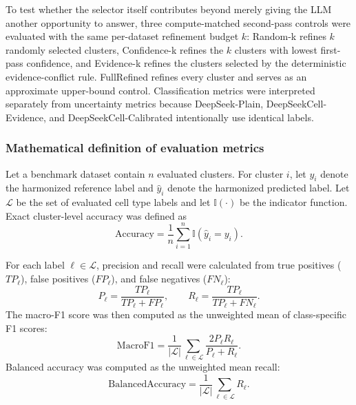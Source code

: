 \documentclass[referee,lineno,pdflatex]{sn-jnl}
\begin{document}
To test whether the selector itself contributes beyond merely giving the LLM another opportunity to answer, three compute-matched second-pass controls were evaluated with the same per-dataset refinement budget $k$: Random-k refines $k$ randomly selected clusters, Confidence-k refines the $k$ clusters with lowest first-pass confidence, and Evidence-k refines the clusters selected by the deterministic evidence-conflict rule. FullRefined refines every cluster and serves as an approximate upper-bound control. Classification metrics were interpreted separately from uncertainty metrics because DeepSeek-Plain, DeepSeekCell-Evidence, and DeepSeekCell-Calibrated intentionally use identical labels.

\subsubsection{Mathematical definition of evaluation metrics}

Let a benchmark dataset contain $n$ evaluated clusters. For cluster $i$, let $y_i$ denote the harmonized reference label and $\hat{y}_i$ denote the harmonized predicted label. Let $\mathcal{L}$ be the set of evaluated cell type labels and let $\mathbb{I}(\cdot)$ be the indicator function. Exact cluster-level accuracy was defined as
\begin{equation}
\mathrm{Accuracy}=\frac{1}{n}\sum_{i=1}^{n}\mathbb{I}(\hat{y}_i=y_i).
\label{eq:accuracy}
\end{equation}

For each label $\ell \in \mathcal{L}$, precision and recall were calculated from true positives ($TP_\ell$), false positives ($FP_\ell$), and false negatives ($FN_\ell$):
\begin{equation}
P_\ell=\frac{TP_\ell}{TP_\ell+FP_\ell}, \qquad
R_\ell=\frac{TP_\ell}{TP_\ell+FN_\ell}.
\label{eq:precision-recall}
\end{equation}
The macro-F1 score was then computed as the unweighted mean of class-specific F1 scores:
\begin{equation}
\mathrm{MacroF1}=\frac{1}{|\mathcal{L}|}\sum_{\ell\in\mathcal{L}}
\frac{2P_\ell R_\ell}{P_\ell+R_\ell}.
\label{eq:macrof1}
\end{equation}
Balanced accuracy was computed as the unweighted mean recall:
\begin{equation}
\mathrm{BalancedAccuracy}=\frac{1}{|\mathcal{L}|}\sum_{\ell\in\mathcal{L}}R_\ell.
\label{eq:balancedaccuracy}
\end{equation}
\end{document}
